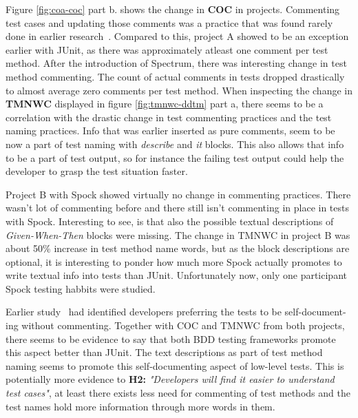 Figure \ref{fig:coa-coc} part b. shows the change in \textbf{COC} in projects. Commenting test cases and updating those
comments was a practice that was found rarely done in earlier research~\cite{li2016automatically}. Compared to this,
project A showed to be an exception earlier with JUnit, as there was approximately atleast one comment per test method.
After the introduction of Spectrum, there was interesting change in test method commenting. The count of actual comments
in tests dropped drastically to almost average zero comments per test method. When inspecting the change in \textbf{TMNWC}
displayed in figure \ref{fig:tmnwc-ddtm} part a, there seems to be a correlation with the drastic change in test commenting
practices and the test naming practices. Info that was earlier inserted as pure comments, seem to be now a part of test
naming with \textit{describe} and \textit{it} blocks. This also allows that info to be a part of test output, so for instance
the failing test output could help the developer to grasp the test situation faster.

Project B with Spock showed virtually no change in commenting practices. There wasn't lot of commenting before and there still isn't
commenting in place in tests with Spock. Interesting to see, is that also the possible textual descriptions of \textit{Given-When-Then} blocks
were missing. The change in TMNWC in project B was about 50\% increase in test method name words, but as the block descriptions
are optional, it is interesting to ponder how much more Spock actually promotes to write textual info into tests than
JUnit. Unfortunately now, only one participant Spock testing habbits were studied.

Earlier study~\cite{li2016automatically} had identified developers preferring the tests to be self-document- ing without commenting.
Together with COC and TMNWC from both projects, there seems to be evidence to say that both BDD testing frameworks
promote this aspect better than JUnit. The text descriptions as part of test method naming seems to promote this self-documenting
aspect of low-level tests. This is potentially more evidence to \textbf{H2:} \textit{"Developers will find it easier to understand test cases"}, at least
there exists less need for commenting of test methods and the test names hold more information through more words in them.

